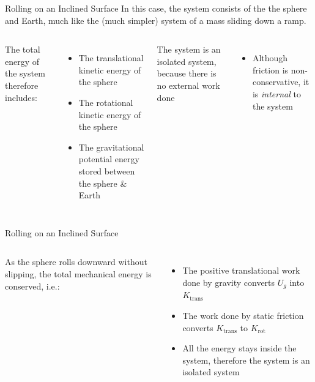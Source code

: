 \documentclass[12pt,compress,aspectratio=169]{beamer}
\begin{document}
\begin{frame}{Rolling on an Inclined Surface}
  In this case, the system consists of the the sphere and Earth, much like the
  (much simpler) system of a mass sliding down a ramp.

  \vspace{.2in}
  \begin{columns}
    

    The total energy of the system therefore includes:
    \begin{itemize}
    \item The translational kinetic energy of the sphere
    \item The rotational kinetic energy of the sphere
    \item The gravitational potential energy stored between the sphere \& Earth
    \end{itemize}
    The system is an isolated system, because there is no external work done
    \begin{itemize}
    \item Although friction is non-conservative, it is \emph{internal} to the
      system
    \end{itemize}
  \end{columns}
\end{frame}



\begin{frame}{Rolling on an Inclined Surface}
  \begin{columns}
    

    As the sphere rolls downward without slipping, the total mechanical
    energy is conserved, i.e.:

    \begin{itemize}
    \item\vspace{-.1in}The positive translational work done by gravity converts
      $U_g$ into $K_\text{trans}$
    \item The work done by static friction converts $K_\text{trans}$ to
      $K_\text{rot}$
    \item All the energy stays inside the system, therefore the system is an
      isolated system
    \end{itemize}
  \end{columns}
\end{frame} 
\end{document}
